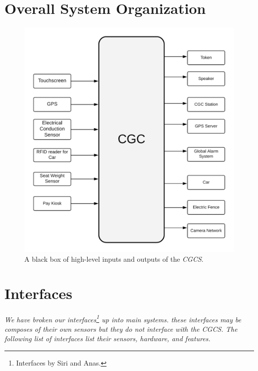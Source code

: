 \documentclass[12pt]{article}
\begin{document}
\section{Overall System Organization} 
\label{sys}

    \begin{figure}[H]
  		\centerline{\includegraphics[scale=.25]{CGCBlackBox.png}}
  		\caption{A black box of high-level inputs and outputs of the \textit{CGCS}.}
  		\label{fig:blackbox}
	\end{figure}


\vfill
\pagebreak



\section{Interfaces} %
\label{int}
\paragraph{} \textit{We have broken our interfaces\footnote{Interfaces by Siri and Anas.} up into main systems. these interfaces may be composes of their own sensors but they do not interface with the CGCS. The following list of interfaces list their sensors, hardware, and features.}
\end{document}
